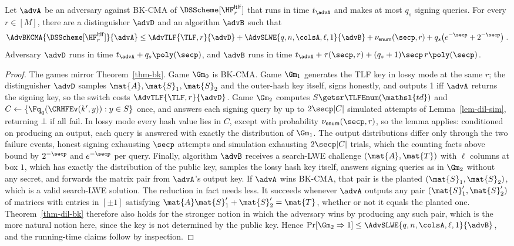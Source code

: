 \begin{theorem} \label{thm-dil-bk}
Let $\advA$ be an adversary against BK-CMA of $\DSScheme[\HF^{\mathsf{ltlf}}_r]$ that runs in time $t_{\advA}$ and makes at most $q_s$ signing queries. For every $r\in[M]$, there are a distinguisher $\advD$ and an algorithm $\advB$ such that
$$
\AdvBKCMA{\DSScheme[\HF^{\mathsf{ltlf}}_r]}{\advA}
\le
\AdvTLF{\TLF,r}{\advD}
+\AdvSLWE{q,n,\colsA,\ell,1}{\advB}
+\nu_{\mathsf{enum}}(\secp,r)
+q_s\big(e^{-\secp}+2^{-\secp}\big) \;.
$$
Adversary $\advD$ runs in time $t_{\advA}+q_s\poly(\secp)$, and $\advB$ runs in time $t_{\advA}+\tau(\secp,r)+(q_s+1)\secp\, r\poly(\secp)$.
\end{theorem}

\begin{proof}
The games mirror Theorem~\ref{thm-bk}. Game $\Gm_0$ is BK-CMA. Game $\Gm_1$ generates the TLF key in lossy mode at the same $r$; the distinguisher $\advD$ samples $\mat{A},\mat{S}_1,\mat{S}_2$ and the outer-hash key itself, signs honestly, and outputs 1 iff $\advA$ returns the signing key, so the switch costs $\AdvTLF{\TLF,r}{\advD}$. Game $\Gm_2$ computes $S\getsr\TLFEnum(\mathsl{td})$ and $C\gets\{\Fq_q(\CRHFEv(k',y)):y\in S\}$ once, and answers each signing query by up to $2\secp|C|$ simulated attempts of Lemma~\ref{lem-dil-sim}, returning $\bot$ if all fail. In lossy mode every hash value lies in $C$, except with probability $\nu_{\mathsf{enum}}(\secp,r)$, so the lemma applies: conditioned on producing an output, each query is answered with exactly the distribution of $\Gm_1$. The output distributions differ only through the two failure events, honest signing exhausting $\secp$ attempts and simulation exhausting $2\secp|C|$ trials, which the counting facts above bound by $2^{-\secp}$ and $e^{-\secp}$ per query. Finally, algorithm $\advB$ receives a search-LWE challenge $(\mat{A},\mat{T})$ with $\ell$ columns at box $1$, which has exactly the distribution of the public key, samples the lossy hash key itself, answers signing queries as in $\Gm_2$ without any secret, and forwards the matrix pair from $\advA$'s output key. If $\advA$ wins BK-CMA, that pair is the planted $(\mat{S}_1,\mat{S}_2)$, which is a valid search-LWE solution. The reduction in fact needs less. It succeeds whenever $\advA$ outputs any pair $(\mat{S}_1',\mat{S}_2')$ of matrices with entries in $[\pm1]$ satisfying $\mat{A}\mat{S}_1'+\mat{S}_2' = \mat{T}$, whether or not it equals the planted one. Theorem~\ref{thm-dil-bk} therefore also holds for the stronger notion in which the adversary wins by producing any such pair, which is the more natural notion here, since the key is not determined by the public key. Hence $\Pr[\Gm_2\Rightarrow1]\le\AdvSLWE{q,n,\colsA,\ell,1}{\advB}$, and the running-time claims follow by inspection.
\end{proof}

